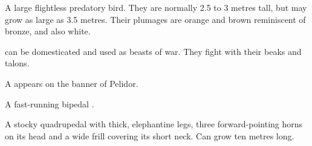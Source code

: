 \begin{gloss}










\begin{comment}
\paragraph{\grulcan}
\end{comment}
\gitem{\grulcan}
A large flightless predatory bird. 
They are normally 2.5 to 3 metres tall, but may grow as large as 3.5 metres. 
Their plumages are orange and brown reminiscent of bronze, and also white. 

\Grulcans{} can be domesticated and used as beasts of war. 
They fight with their beaks and talons. 

A \grulcan{} appears on the banner of Pelidor.










\begin{comment}
\paragraph{\miksha}
\end{comment}
\gitem{\miksha}
A fast-running bipedal . 









\begin{comment}
\paragraph{\mulgron}
\end{comment}
\gitem{\mulgron}
A stocky quadrupedal  with thick, elephantine legs, three forward-pointing horns on its head and a wide frill covering its short neck. 
Can grow ten metres long. 


\end{gloss}
